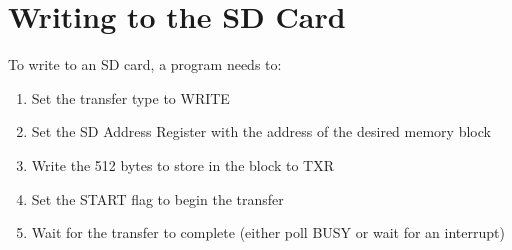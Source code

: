 \section{Writing to the SD Card}
To write to an SD card, a program needs to:
\begin{enumerate}
    \item Set the transfer type to WRITE
    \item Set the SD Address Register with the address of the desired memory block
    \item Write the 512 bytes to store in the block to TXR
    \item Set the START flag to begin the transfer
    \item Wait for the transfer to complete (either poll BUSY or wait for an interrupt)
\end{enumerate}

